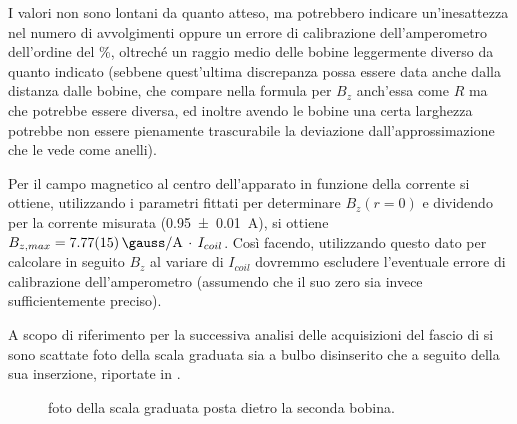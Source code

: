 	I valori non sono lontani da quanto atteso, ma potrebbero indicare un'inesattezza
	nel numero di avvolgimenti oppure un errore di calibrazione dell'amperometro dell'ordine del \%,
	oltreché un raggio medio delle bobine leggermente diverso da quanto indicato
	(sebbene quest'ultima discrepanza possa essere data anche dalla distanza dalle bobine, che compare nella
	formula per $B_z$ anch'essa come $R$ ma che potrebbe essere diversa, ed inoltre avendo le bobine
	una certa larghezza potrebbe non essere pienamente trascurabile la deviazione
	dall'approssimazione che le vede come anelli).

	Per il campo magnetico al centro dell'apparato in funzione della corrente si ottiene,
	utilizzando i parametri fittati per determinare $B_z(r=0)$ e dividendo per la corrente
	misurata (\SI{0.95(1)}{\A}), si ottiene $B_{z,max} = \SI{7.77(15)}{\gauss\per\A} \, \cdot \, I_{coil}$.
	Così facendo, utilizzando questo dato per calcolare in seguito $B_z$ al variare di $I_{coil}$
	dovremmo escludere l'eventuale errore di calibrazione dell'amperometro
	(assumendo che il suo zero sia invece sufficientemente preciso).

	A scopo di riferimento per la successiva analisi delle acquisizioni
	del fascio di \e si sono scattate foto della scala graduata sia
	a bulbo disinserito che a seguito della sua inserzione, riportate in .

	\begin{figure}[hb]
		\centering
		\caption{foto della scala graduata posta dietro la seconda bobina.}
		\label{fig:scala}
	\end{figure}



